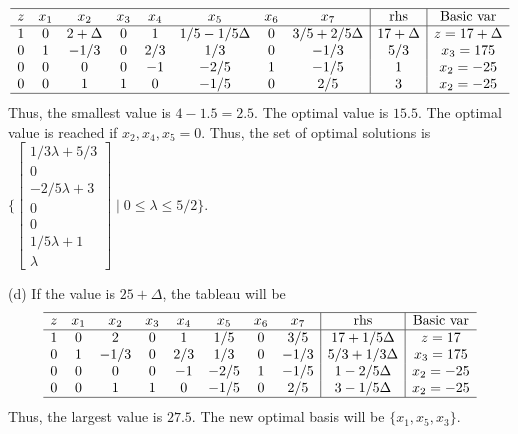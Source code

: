 \documentclass[12pt]{article}
\begin{document}
\begin{equation*}
  \begin{array}{cccccccc|c|c}
    \hline
    z &  x_1      &  x_2 &  x_3 &  x_4 & x_5 & x_6 & x_7 &   \text{rhs} & \text{Basic var}   \\ \hline
    1 &    0     &    2+\Delta &    0 &    1 & 1/5 - 1/5\Delta    & 0 & 3/5+2/5\Delta & 17+\Delta      &  z=17+\Delta              \\
    0 &    1      &    -1/3 &    0 &    2/3 &    1/3 & 0 & -1/3 & 5/3        &  x_3 = 175         \\
    0 &    0      &    0 &    0 &    -1 &    -2/5 & 1 & -1/5 & 1       &  x_2 = -25           \\
    0 &    0      &    1 &    1 &    0 &    -1/5 & 0 & 2/5 & 3       &  x_2 = -25           \\ \hline
  \end{array}
\end{equation*}
Thus, the smallest value is $4-1.5=2.5$. The optimal value is $15.5$. The optimal value is reached if $x_2,x_4,x_5=0$. Thus, the set of optimal solutions is $\{\begin{bmatrix}  1/3\lambda+5/3 \\ 0 \\ -2/5\lambda+3 \\ 0 \\ 0 \\ 1/5\lambda+1 \\ \lambda \end{bmatrix}\mid 0\le\lambda\le 5/2\}$.

(d) If the value is $25+\Delta$, the tableau will be
\begin{equation*}
  \begin{array}{cccccccc|c|c}
    \hline
    z &  x_1      &  x_2 &  x_3 &  x_4 & x_5 & x_6 & x_7 &   \text{rhs} & \text{Basic var}   \\ \hline
    1 &    0     &    2 &   0 &    1 & 1/5    & 0 & 3/5 & 17+1/5\Delta      &  z=17              \\
    0 &    1      &    -1/3 &    0 &    2/3 &    1/3 & 0 & -1/3 & 5/3+1/3\Delta        &  x_3 = 175         \\
    0 &    0      &    0 &    0 &    -1 &    -2/5 & 1 & -1/5 & 1-2/5\Delta       &  x_2 = -25           \\
    0 &    0      &    1 &    1 &    0 &    -1/5 & 0 & 2/5 & 3-1/5\Delta       &  x_2 = -25           \\ \hline
  \end{array}
\end{equation*}
Thus, the largest value is $27.5$. The new optimal basis will be $\{x_1,x_5,x_3\}$.
\end{document}

